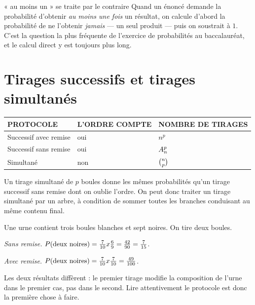 \begin{methode}{« au moins un » se traite par le contraire}
Quand un énoncé demande la probabilité d'obtenir \emph{au moins une fois} un
résultat, on calcule d'abord la probabilité de ne l'obtenir \emph{jamais} —
un seul produit — puis on soustrait à $1$. C'est la question la plus fréquente
de l'exercice de probabilités au baccalauréat, et le calcul direct y est
toujours plus long.
\end{methode}

\section{Tirages successifs et tirages simultanés}

\begin{propriete}
\begin{center}
\setlength{\tabcolsep}{7pt}
\renewcommand{\arraystretch}{1.3}
\begin{tabular}{@{}lll@{}}
\toprule
\textsf{\footnotesize\bfseries PROTOCOLE} &
\textsf{\footnotesize\bfseries L'ORDRE COMPTE} &
\textsf{\footnotesize\bfseries NOMBRE DE TIRAGES} \\
\midrule
Successif avec remise & oui & $n^{p}$ \\
Successif sans remise & oui & $\arrang{p}{n}$ \\
Simultané & non & $\combi{p}{n}$ \\
\bottomrule
\end{tabular}
\end{center}
\end{propriete}

\begin{remarque}
Un tirage simultané de $p$ boules donne les mêmes probabilités qu'un tirage
successif sans remise dont on oublie l'ordre. On peut donc traiter un tirage
simultané par un arbre, à condition de sommer toutes les branches conduisant
au même contenu final.
\end{remarque}

\begin{exemple}
Une urne contient trois boules blanches et sept noires. On tire deux boules.

\emph{Sans remise.} $\proba{\text{deux noires}}
= \frac{7}{10} \times \frac69 = \frac{42}{90} = \frac{7}{15}$.

\emph{Avec remise.} $\proba{\text{deux noires}}
= \frac{7}{10} \times \frac{7}{10} = \frac{49}{100}$.

Les deux résultats diffèrent : le premier tirage modifie la composition de
l'urne dans le premier cas, pas dans le second. Lire attentivement le
protocole est donc la première chose à faire.
\end{exemple}

